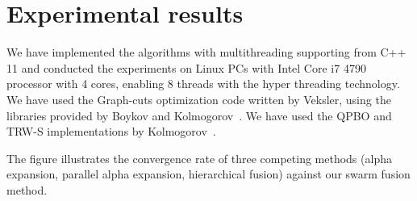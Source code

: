 \section{Experimental results}
\label{section:results}
We have implemented the algorithms with multithreading supporting from
C++ 11 and conducted the experiments on Linux PCs with Intel Core i7
4790 processor with 4 cores, enabling 8 threads with the hyper
threading technology. We have used the Graph-cuts optimization code
written by Veksler, using the libraries provided by Boykov and
Kolmogorov~\cite{middlebury_mrf,alpha_expansion,what_energy_can_be_min_by_gc, mrf_experimental}.
%
%
We have used the QPBO and TRW-S implementations by
Kolmogorov~\cite{QPBO, TRW-S}.



The figure illustrates the convergence rate of three competing methods
(alpha expansion, parallel alpha expansion, hierarchical fusion) against
our swarm fusion method.


